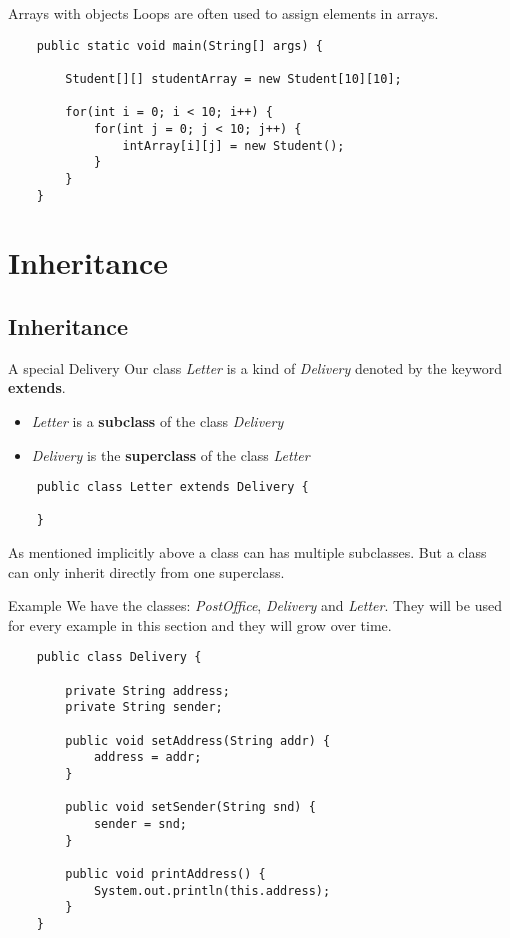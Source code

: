 \begin{frame}[fragile]{Arrays with objects}
	Loops are often used to assign elements in arrays.
	\begin{lstlisting}
	public static void main(String[] args) {

	    Student[][] studentArray = new Student[10][10];
	    
	    for(int i = 0; i < 10; i++) {
	        for(int j = 0; j < 10; j++) {
	            intArray[i][j] = new Student();
	        }
	    }
	}
	\end{lstlisting}
\end{frame}

\section{Inheritance}
\subsection{Inheritance}


\begin{frame}[fragile]{A special Delivery}
	Our class \emph{Letter} is a kind of \emph{Delivery} denoted by the keyword \textbf{extends}.
	\begin{itemize}
		\item \emph{Letter} is a \textbf{subclass} of the class \emph{Delivery}
		\item \emph{Delivery} is the \textbf{superclass} of the class \emph{Letter}
	\end{itemize}
	\begin{lstlisting}
	public class Letter extends Delivery {
	
	}
	\end{lstlisting}
	\vfill
	As mentioned implicitly above a class can has multiple subclasses. 
	But a class can only inherit directly from one superclass.
\end{frame}

\begin{frame}[fragile]{Example}
	We have the classes: \emph{PostOffice}, \emph{Delivery} and \emph{Letter}.
	They will be used for every example in this section and they will grow over time.
	\begin{lstlisting}
	public class Delivery {
	
	    private String address;
	    private String sender;
	    
	    public void setAddress(String addr) {
			address = addr;
	    }
	    
	    public void setSender(String snd) {
			sender = snd;
	    }
	    
	    public void printAddress() {
	        System.out.println(this.address);
	    }
	}
	\end{lstlisting}
\end{frame}

